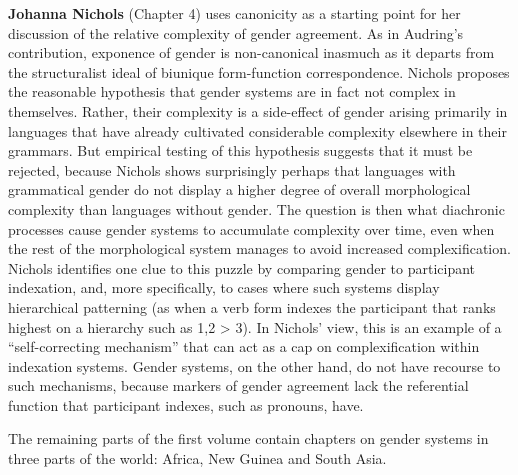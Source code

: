 \documentclass[output=collectionpaper]{langsci/langscibook}
\begin{document}
\textbf{Johanna Nichols} (Chapter 4) uses canonicity as a starting point for her discussion of the relative complexity of gender agreement. As in Audring’s contribution, exponence of gender is non-canonical inasmuch as it departs from the structuralist ideal of biunique form-function correspondence. Nichols proposes the reasonable hypothesis that gender systems are in fact not complex in themselves. Rather, their complexity is a side-effect of gender arising primarily in languages that have already cultivated considerable complexity elsewhere in their grammars. But empirical testing of this hypothesis suggests that it must be rejected, because Nichols shows \textendash{} surprisingly perhaps \textendash{} that languages with grammatical gender do not display a higher degree of overall morphological complexity than languages without gender. The question is then what diachronic processes cause gender systems to accumulate complexity over time, even when the rest of the morphological system manages to avoid increased complexification. Nichols identifies one clue to this puzzle by comparing gender to participant indexation, and, more specifically, to cases where such systems display hierarchical patterning (as when a verb form indexes the participant that ranks highest on a hierarchy such as 1,2 > 3). In Nichols’ view, this is an example of a ``self-correcting mechanism'' that can act as a cap on complexification within indexation systems. Gender systems, on the other hand, do not have recourse to such mechanisms, because markers of gender agreement lack the referential function that participant indexes, such as pronouns, have.

The remaining parts of the first volume contain chapters on gender systems in three parts of the world: Africa, New Guinea and South Asia.
\end{document}

